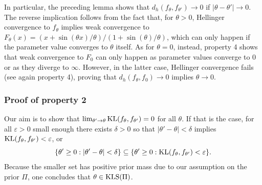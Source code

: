 \documentclass[11pt,twoside]{article}
\newcommand{\kl}{\textnormal{KL}}
\newcommand{\kls}{\textnormal{KLS}}
\begin{document}
In particular, the preceding lemma shows that $d_h(f_\theta, f_{\theta'}) \to 0$ if $|\theta - \theta'| \to 0$. The reverse implication follows from the fact that, for $\theta>0$, Hellinger convergence to $f_\theta$ implies weak convergence to $F_\theta(x) = (x + \sin(\theta x)/\theta)/(1 + \sin(\theta)/\theta)$, which can only happen if the parameter value converges to $\theta$ itself. As for $\theta = 0$, instead, property 4 shows that weak convergence to $F_0$ can only happen as parameter values converge to 0 or as they diverge to $\infty$. However, in the latter case, Hellinger convergence fails (see again property 4), proving that $d_h(f_\theta, f_0)\to 0$ implies $\theta\to 0$.




\subsubsection*{Proof of property 2}

Our aim is to show that $\lim_{\theta'\to \theta}\kl(f_\theta, f_{\theta'}) =0$ for all $\theta$. If that is the case, for all $\varepsilon>0$ small enough there exists $\delta>0$ so that $|\theta'-\theta|<\delta$ implies $\kl(f_\theta, f_{\theta'})<\varepsilon$, or
%
    $$\{\theta'\geq 0 : |\theta'-\theta|<\delta\}\subseteq \{\theta'\geq 0 : \kl(f_\theta, f_{\theta'})<\varepsilon\}.$$
%
Because the smaller set has positive prior mass due to our assumption on the prior $\Pi$, one concludes that $\theta\in\kls(\Pi)$.
\end{document}

